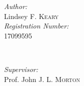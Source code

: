 \documentclass[12pt,oneside]{book}
\begin{document}
\begin{titlepage}
\begin{minipage}{0.4\textwidth}
\begin{flushleft} \large
\emph{Author:}\\
Lindsey F. \textsc{Keary}\\[0.5cm] 
\emph{Registration Number:} \\
17099595 
\end{flushleft}
\end{minipage}
~
\begin{minipage}{0.4\textwidth}
\begin{flushright} \large
\emph{Supervisor:} \\
Prof. John J. L. \textsc{Morton} \\[0.5cm]
\end{flushright}
\end{minipage}\\[1cm]






\end{titlepage}


\end{document}
